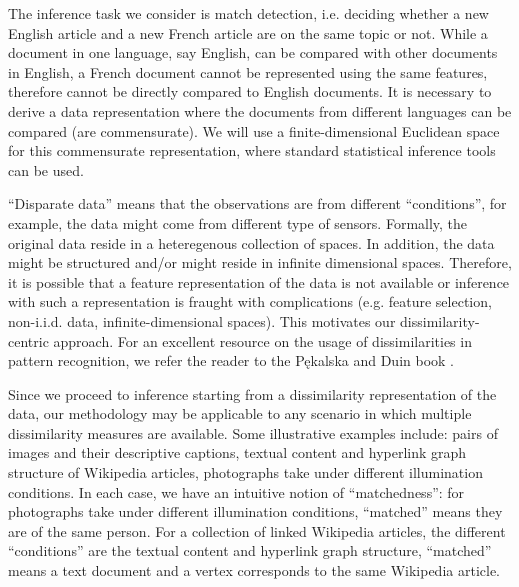 \documentclass[12pt,oneside,final]{thesis}\usepackage[]{graphicx}\usepackage[]{color}
\begin{document}
  The inference task we consider is match detection, i.e. deciding whether a new English article and a new French article are on the same topic or not. While  a document in one language, say English, can be compared with other documents in English, a  French document  cannot be represented using the same features, therefore cannot be directly compared to English documents.  It is necessary   to derive a data representation  where the  documents from different languages can be compared (are commensurate).  %
	We will use a finite-dimensional Euclidean space for  this commensurate representation, where standard  statistical inference tools can be used.
	
     ``Disparate data''  means that  the observations are from  different ``conditions'', for example, the data might come from different type of sensors. Formally, the original data  reside in a heteregenous collection of  spaces.  In addition, the data might be structured and/or might reside in  infinite dimensional spaces. Therefore, it is possible that a feature representation of the data is not available or inference with such a representation is fraught with complications (e.g. feature selection, non-i.i.d. data, infinite-dimensional spaces). This motivates our  dissimilarity-centric approach. For an excellent resource on the usage of dissimilarities in pattern recognition, we refer the reader to the P\k{e}kalska and Duin book \cite{duin2005dissimilarity}.
		
		Since we proceed to inference starting from a dissimilarity representation of the data, our methodology may be applicable to any scenario in which multiple dissimilarity measures are available.  Some illustrative examples include:  pairs of images and their descriptive captions,  textual content  and  hyperlink graph
structure of  Wikipedia  articles, photographs take under different illumination conditions. In each case, we have an intuitive notion of ``matchedness'': for photographs take under different illumination conditions, ``matched'' means they are of the same person. For a collection of linked Wikipedia articles, the different ``conditions''  are  the textual content and hyperlink graph structure, ``matched'' means a text document and  a vertex  corresponds to the same Wikipedia article. 
\end{document}
